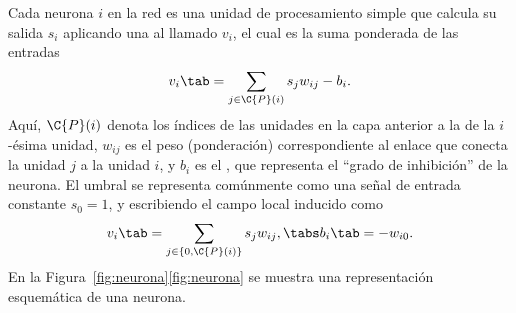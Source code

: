Cada neurona $i$ en la red es una unidad de procesamiento simple que
calcula su salida $s_i$ aplicando una  al
llamado  $v_i$, el cual es la suma ponderada de
las entradas
%
\begin{align}
  v_i \tab= \sum_{j\in\C{P}(i)} s_j w_{ij} - b_i .
\end{align}
%
Aquí, $\C{P}(i)$ denota los índices de las unidades en la capa
anterior a la de la $i$-ésima unidad, $w_{ij}$ es el peso
(ponderación) correspondiente al enlace que conecta la unidad $j$ a la
unidad $i$, y $b_i$ es el , que representa el ``grado de
inhibición'' de la neurona. El umbral se representa comúnmente
como una señal de entrada constante $s_0=1$, y escribiendo
el campo local inducido como
%
\begin{align}
  v_i \tab= \sum_{j\in\{0,\C{P}(i)\}} s_j w_{ij}, \tabs b_i\tab=-w_{i0}.
\end{align}
%
En la
\iflatexml{}Figura~\ref{fig:neurona}\else\autoref{fig:neurona} se
muestra una representación esquemática de una neurona.
